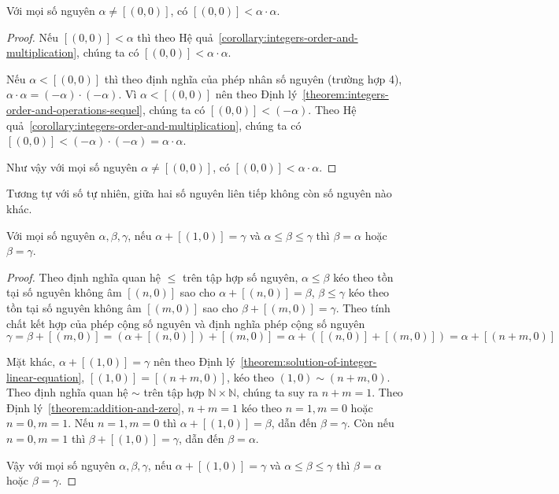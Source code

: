 \begin{theorem}\label{theorem:square-of-nonzero-integers}
	Với mọi số nguyên $\alpha\ne [(0,0)]$, có $[(0,0)] < \alpha\cdot\alpha$.
\end{theorem}

\begin{proof}
	Nếu $[(0,0)] < \alpha$ thì theo Hệ quả~\ref{corollary:integers-order-and-multiplication}, chúng ta có $[(0,0)] < \alpha\cdot\alpha$.

	Nếu $\alpha < [(0,0)]$ thì theo định nghĩa của phép nhân số nguyên (trường hợp 4), $\alpha\cdot\alpha = (-\alpha)\cdot(-\alpha)$. Vì $\alpha < [(0,0)]$ nên theo Định lý~\ref{theorem:integers-order-and-operations-sequel}, chúng ta có $[(0,0)] < (-\alpha)$. Theo Hệ quả~\ref{corollary:integers-order-and-multiplication}, chúng ta có $[(0,0)] < (-\alpha)\cdot(-\alpha) = \alpha\cdot\alpha$.

	Như vậy với mọi số nguyên $\alpha\ne [(0,0)]$, có $[(0,0)] < \alpha\cdot\alpha$.
\end{proof}

Tương tự với số tự nhiên, giữa hai số nguyên liên tiếp không còn số nguyên nào khác.
\begin{theorem}
	Với mọi số nguyên $\alpha, \beta, \gamma$, nếu $\alpha + [(1,0)] = \gamma$ và $\alpha \leq \beta \leq \gamma$ thì $\beta = \alpha$ hoặc $\beta = \gamma$.
\end{theorem}

\begin{proof}
	Theo định nghĩa quan hệ $\leq$ trên tập hợp số nguyên, $\alpha \leq \beta$ kéo theo tồn tại số nguyên không âm $[(n,0)]$ sao cho $\alpha + [(n, 0)] = \beta$, $\beta \leq \gamma$ kéo theo tồn tại số nguyên không âm $[(m, 0)]$ sao cho $\beta + [(m, 0)] = \gamma$. Theo tính chất kết hợp của phép cộng số nguyên và định nghĩa phép cộng số nguyên
	\[
		\gamma = \beta + [(m, 0)] = (\alpha + [(n, 0)]) + [(m, 0)] = \alpha + ([(n, 0)] + [(m, 0)]) = \alpha + [(n+m, 0)]
	\]

	Mặt khác, $\alpha + [(1, 0)] = \gamma$ nên theo Định lý~\ref{theorem:solution-of-integer-linear-equation}, $[(1, 0)] = [(n+m, 0)]$, kéo theo $(1, 0)\sim (n+m, 0)$. Theo định nghĩa quan hệ $\sim$ trên tập hợp $\mathbb{N}\times\mathbb{N}$, chúng ta suy ra $n + m = 1$. Theo Định lý~\ref{theorem:addition-and-zero}, $n + m = 1$ kéo theo $n = 1, m = 0$ hoặc $n = 0, m = 1$. Nếu $n = 1, m = 0$ thì $\alpha + [(1, 0)] = \beta$, dẫn đến $\beta = \gamma$. Còn nếu $n = 0, m = 1$ thì $\beta + [(1, 0)] = \gamma$, dẫn đến $\beta = \alpha$.

	Vậy với mọi số nguyên $\alpha, \beta, \gamma$, nếu $\alpha + [(1,0)] = \gamma$ và $\alpha \leq \beta \leq \gamma$ thì $\beta = \alpha$ hoặc $\beta = \gamma$.
\end{proof}


